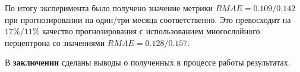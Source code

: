 По итогу эксперимента было получено значение метрики $RMAE = 0.109/0.142$ при прогнозировании на один/три месяца соответственно. Это превосходит на $17\%/11\%$ качество прогнозирования с использованием многослойного перцептрона со значениями $RMAE = 0.128/0.157$.





В \textbf{заключении} сделаны выводы о полученных в процессе работы результатах.

\section*{}



